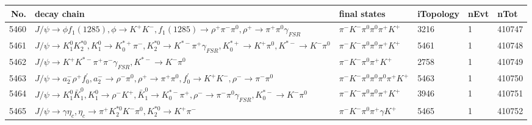 \begin{table}[htbp] 
\begin{center}
\begin{small}
\begin{tabular}{rlllll}\hline\hline
 No. & decay chain & final states &  iTopology & nEvt & nTot \\\hline
5460&$J/\psi       \rightarrow \phi           f_{1}(1285)    , \phi            \rightarrow K^{+}          K^{-}          , f_{1}(1285)     \rightarrow \rho^{+}      \pi^{-}        \pi^{0}        , \rho^{+}       \rightarrow \pi^{+}        \pi^{0}        \gamma_{FSR} $&$\pi^{-}        K^{-}          \pi^{0}        \pi^{0}        \pi^{+}        K^{+}          $& 3216&    1&410747\\
5461&$J/\psi       \rightarrow K_1^{0}        K_2^{*0}       , K_1^{0}         \rightarrow K_{0}^{*+}     \pi^{-}        , K_2^{*0}        \rightarrow K^{*-}         \pi^{+}        \gamma_{FSR} , K_{0}^{*+}      \rightarrow K^{+}          \pi^{0}        , K^{*-}          \rightarrow K^{-}          \pi^{0}        $&$\pi^{-}        K^{-}          \pi^{0}        \pi^{0}        \pi^{+}        K^{+}          $& 5461&    1&410748\\
5462&$J/\psi       \rightarrow K^{+}          K^{*-}         \pi^{+}        \pi^{-}        \gamma_{FSR} , K^{*-}          \rightarrow K^{-}          \pi^{0}        $&$\pi^{-}        K^{-}          \pi^{0}        \pi^{+}        K^{+}          $& 2758&    1&410749\\
5463&$J/\psi       \rightarrow a_{2}^{-}      \rho^{+}      f^{'}_{0}     , a_{2}^{-}       \rightarrow \rho^{-}      \pi^{0}        , \rho^{+}       \rightarrow \pi^{+}        \pi^{0}        , f^{'}_{0}      \rightarrow K^{+}          K^{-}          , \rho^{-}       \rightarrow \pi^{-}        \pi^{0}        $&$\pi^{-}        K^{-}          \pi^{0}        \pi^{0}        \pi^{0}        \pi^{+}        K^{+}          $& 5463&    1&410750\\
5464&$J/\psi       \rightarrow K_1^{0}        \bar{K}_1^{0} , K_1^{0}         \rightarrow \rho^{-}      K^{+}          , \bar{K}_1^{0}  \rightarrow K_{0}^{*-}     \pi^{+}        , \rho^{-}       \rightarrow \pi^{-}        \pi^{0}        \gamma_{FSR} , K_{0}^{*-}      \rightarrow K^{-}          \pi^{0}        $&$\pi^{-}        K^{-}          \pi^{0}        \pi^{0}        \pi^{+}        K^{+}          $& 3946&    1&410751\\
5465&$J/\psi       \rightarrow \gamma       \eta_{c}    , \eta_{c}     \rightarrow \pi^{+}        K_2^{*0}       K^{-}          \pi^{0}        , K_2^{*0}        \rightarrow K^{+}          \pi^{-}        $&$\pi^{-}        K^{-}          \pi^{0}        \pi^{+}        \gamma       K^{+}          $& 5465&    1&410752\\

\end{tabular}
\end{small}
\end{center}
\end{table}
